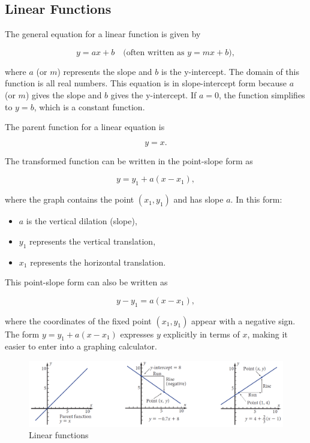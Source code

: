 \subsection*{Linear Functions}
The general equation for a linear function is given by

\[
y = ax + b \quad \text{(often written as } y = mx + b\text{)},
\]

where \(a\) (or \(m\)) represents the slope and \(b\) is the y-intercept. The domain of this function is all real numbers. This equation is in slope-intercept form because \(a\) (or \(m\)) gives the slope and \(b\) gives the y-intercept. If \(a = 0\), the function simplifies to \(y = b\), which is a constant function.

The parent function for a linear equation is

\[
y = x.
\]

The transformed function can be written in the point-slope form as

\[
y = y_1 + a(x - x_1),
\]

where the graph contains the point \((x_1, y_1)\) and has slope \(a\). In this form:
\begin{itemize}
    \item \(a\) is the vertical dilation (slope),
    \item \(y_1\) represents the vertical translation,
    \item \(x_1\) represents the horizontal translation.
\end{itemize}

This point-slope form can also be written as

\[
y - y_1 = a(x - x_1),
\]

where the coordinates of the fixed point \((x_1, y_1)\) appear with a negative sign. The form \(y = y_1 + a(x - x_1)\) expresses \(y\) explicitly in terms of \(x\), making it easier to enter into a graphing calculator.

\begin{figure}[h]
    \centering
    \includegraphics[width=1\textwidth]{figure/book1.png} %
    \caption{Linear functions}
    \label{fig:book_image}
\end{figure}

